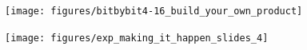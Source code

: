 \documentclass[aspectratio=169]{beamer}
\begin{document}
\begin{frame}

\begin{center}
\texttt{[image: figures/bitbybit4-16\_build\_your\_own\_product]}
\end{center}

\end{frame}
\begin{frame}

\begin{center}
\texttt{[image: figures/exp\_making\_it\_happen\_slides\_4]}
\end{center}

\end{frame}
\frame{\titlepage}
\end{document}
